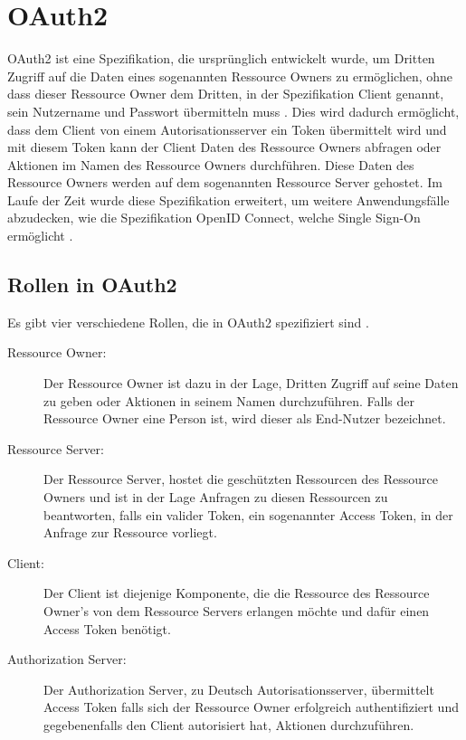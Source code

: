 %
%
\section{OAuth2}
\label{sec:OAuth2}
OAuth2 ist eine Spezifikation, die ursprünglich entwickelt wurde, um Dritten Zugriff auf die Daten eines sogenannten Ressource Owners zu ermöglichen, ohne dass dieser Ressource Owner dem Dritten, in der Spezifikation Client genannt, sein Nutzername und Passwort übermitteln muss \citep{oauth2:2012}. Dies wird dadurch ermöglicht, dass dem Client von einem Autorisationsserver ein Token übermittelt wird und mit diesem Token kann der Client Daten des Ressource Owners abfragen oder Aktionen im Namen des Ressource Owners durchführen. Diese Daten des Ressource Owners werden auf dem sogenannten Ressource Server gehostet.
Im Laufe der Zeit wurde diese Spezifikation erweitert, um weitere Anwendungsfälle abzudecken, wie die Spezifikation OpenID Connect, welche Single Sign-On ermöglicht \citep{openidconnect:2014}. 

\subsection{Rollen in OAuth2}
\label{subsec:OAuth2:RolleninOAuth2}
Es gibt vier verschiedene Rollen, die in OAuth2 spezifiziert sind \citep{oauth2:2012}.

\begin{description}
  \item[Ressource Owner:] Der Ressource Owner ist dazu in der Lage, Dritten Zugriff auf seine Daten zu geben oder Aktionen in seinem Namen durchzuführen. Falls der Ressource Owner eine Person ist, wird dieser als End-Nutzer bezeichnet.
  \item[Ressource Server:] Der Ressource Server, hostet die geschützten Ressourcen des Ressource Owners und ist in der Lage Anfragen zu diesen Ressourcen zu beantworten, falls ein valider Token, ein sogenannter Access Token, in der Anfrage zur Ressource vorliegt.
  \item[Client:] Der Client ist diejenige Komponente, die die Ressource des Ressource Owner's von dem Ressource Servers erlangen möchte und dafür einen Access Token benötigt. 
  \item[Authorization Server:] Der Authorization Server, zu Deutsch Autorisationsserver, übermittelt Access Token falls sich der Ressource Owner erfolgreich authentifiziert und gegebenenfalls den Client autorisiert hat, Aktionen durchzuführen. 
\end{description}

